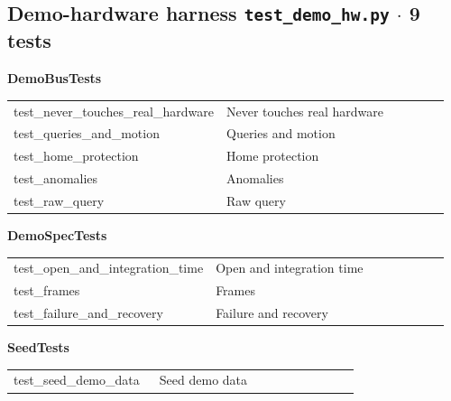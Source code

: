 \subsection{Demo-hardware harness \hfill \normalfont\small\color{soft2}\texttt{test\_demo\_hw.py} $\cdot$ 9 tests}
\par\smallskip \textbf{DemoBusTests}\par\nopagebreak\smallskip
\begin{longtable}{@{}>{\ttfamily\scriptsize\raggedright\arraybackslash}p{0.40\linewidth} >{\footnotesize\raggedright\arraybackslash}p{0.555\linewidth}@{}}
test\_\allowbreak{}never\_\allowbreak{}touches\_\allowbreak{}real\_\allowbreak{}hardware & Never touches real hardware \\
test\_\allowbreak{}queries\_\allowbreak{}and\_\allowbreak{}motion & Queries and motion \\
test\_\allowbreak{}home\_\allowbreak{}protection & Home protection \\
test\_\allowbreak{}anomalies & Anomalies \\
test\_\allowbreak{}raw\_\allowbreak{}query & Raw query \\
\end{longtable}
\par\smallskip \textbf{DemoSpecTests}\par\nopagebreak\smallskip
\begin{longtable}{@{}>{\ttfamily\scriptsize\raggedright\arraybackslash}p{0.40\linewidth} >{\footnotesize\raggedright\arraybackslash}p{0.555\linewidth}@{}}
test\_\allowbreak{}open\_\allowbreak{}and\_\allowbreak{}integration\_\allowbreak{}time & Open and integration time \\
test\_\allowbreak{}frames & Frames \\
test\_\allowbreak{}failure\_\allowbreak{}and\_\allowbreak{}recovery & Failure and recovery \\
\end{longtable}
\par\smallskip \textbf{SeedTests}\par\nopagebreak\smallskip
\begin{longtable}{@{}>{\ttfamily\scriptsize\raggedright\arraybackslash}p{0.40\linewidth} >{\footnotesize\raggedright\arraybackslash}p{0.555\linewidth}@{}}
test\_\allowbreak{}seed\_\allowbreak{}demo\_\allowbreak{}data & Seed demo data \\
\end{longtable}